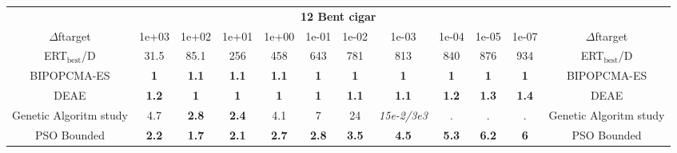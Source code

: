 \begin{tabular}{cccccccccccc}
 & \multicolumn{10}{c}{{\normalsize \textbf{12 Bent cigar}}}\\
$\Delta$ftarget& 1e+03& 1e+02& 1e+01& 1e+00& 1e-01& 1e-02& 1e-03& 1e-04& 1e-05& 1e-07 & $\Delta$ftarget \\
ERT$_{\textrm{best}}$/D& 31.5& 85.1& 256& 458& 643& 781& 813& 840& 876& 934 & ERT$_{\textrm{best}}$/D \\
\hline
BIPOPCMA-ES & \textbf{1} & \textbf{1.1} & \textbf{1.1} & \textbf{1.1} & \textbf{1} & \textbf{1} & \textbf{1} & \textbf{1} & \textbf{1} & \textbf{1} & BIPOPCMA-ES \cite{add_an_entry_for_BIPOPCMA-ES_in_bbob.bib}\\
DEAE & \textbf{1.2} & \textbf{1} & \textbf{1} & \textbf{1} & \textbf{1} & \textbf{1.1} & \textbf{1.1} & \textbf{1.2} & \textbf{1.3} & \textbf{1.4} & DEAE \cite{add_an_entry_for_DEAE_in_bbob.bib}\\
Genetic Algoritm study & 4.7 & \textbf{2.8} & \textbf{2.4} & 4.1 & 7 & 24 & \textit{15e-2}\textit{/3e3} & . & . & . & Genetic Algoritm study \cite{add_an_entry_for_Genetic Algoritm study_in_bbob.bib}\\
PSO Bounded & \textbf{2.2} & \textbf{1.7} & \textbf{2.1} & \textbf{2.7} & \textbf{2.8} & \textbf{3.5} & \textbf{4.5} & \textbf{5.3} & \textbf{6.2} & \textbf{6} & PSO Bounded \cite{add_an_entry_for_PSO Bounded_in_bbob.bib}
\end{tabular}
